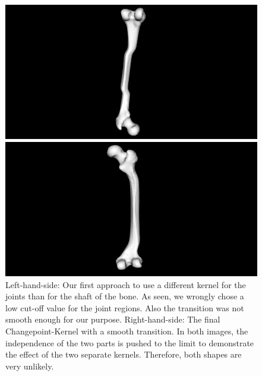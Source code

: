 \documentclass{article} %
\begin{document}
\begin{figure}[H]
	\centering
	\begin{minipage}[h]{0.45\linewidth}
		\includegraphics[width=.9\textwidth]{img/changepoint_kernel.png}
	\end{minipage}%
	\centering
	\begin{minipage}[h]{.45\textwidth}
		\includegraphics[width=.9\textwidth]{img/changepointkernel2.png}
	\end{minipage}
	\caption{Left-hand-side: Our first approach to use a different kernel for the joints than for the shaft of the bone. As seen, we wrongly chose a low cut-off value for the joint regions. Also the transition was not smooth enough for our purpose. Right-hand-side: The final Changepoint-Kernel with a smooth transition. In both images, the independence of the two parts is pushed to the limit to demonstrate the effect of the two separate kernels.  Therefore, both shapes are very unlikely.}
	\label{fig:changepoint_kernel}
\end{figure}
\end{document}
